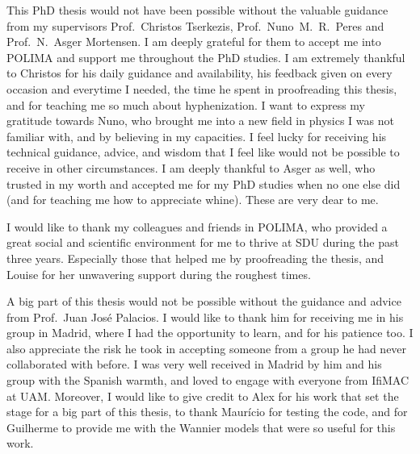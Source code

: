 
%

\begin{ntacknowledgements}

This PhD thesis would not have been possible without the valuable guidance from my supervisors Prof.~Christos Tserkezis, Prof.~Nuno~M.~R.~Peres and Prof.~N.~Asger Mortensen.
I am deeply grateful for them to accept me into POLIMA and support me throughout the PhD studies.
I am extremely thankful to Christos for his daily guidance and availability, his feedback given on every occasion and everytime I needed, the time he spent in proofreading this thesis,
and for teaching me so much about hyphenization.
I want to express my gratitude towards Nuno, who brought me into a new field in physics I was not familiar with, and by believing in my capacities.
I feel lucky for receiving his technical guidance, advice, and wisdom that I feel like would not be possible to receive in other circumstances.
I am deeply thankful to Asger as well, who trusted in my worth and accepted me for my PhD studies when no one else did (and for teaching me how to appreciate whine).
These are very dear to me.

I would like to thank my colleagues and friends in POLIMA, who provided a great social and scientific environment for me to thrive at SDU during the past three years.
Especially those that helped me by proofreading the thesis, and Louise for her unwavering support during the roughest times.

A big part of this thesis would not be possible without the guidance and advice from Prof.~Juan José Palacios.
I would like to thank him for receiving me in his group in Madrid, where I had the opportunity to learn, and for his patience too.
I also appreciate the risk he took in accepting someone from a group he had never collaborated with before.
I was very well received in Madrid by him and his group with the Spanish warmth, and loved to engage with everyone from IfiMAC at UAM\@.
Moreover, I would like to give credit to Alex for his work that set the stage for a big part of this thesis, to thank Maurício for testing the code, and for Guilherme to provide me with the Wannier models that were so useful for this work.


\end{ntacknowledgements}
